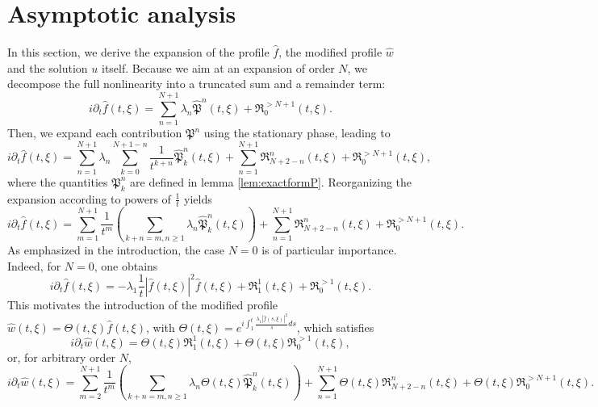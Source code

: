\documentclass[a4paper, 15pt]{article}
\numberwithin{equation}{section}
\begin{document}
\section{Asymptotic analysis}
\label{section:asymptotic}
In this section, we derive the expansion of the profile $\hat{f}$, the modified profile $\hat{w}$ and the solution $u$ itself. Because we aim at an expansion of order $N$, we decompose the full nonlinearity into a truncated sum and a remainder term:
\begin{equation}
    i\partial_t\hat{f}(t,\xi)=\sum_{n=1}^{N+1}\lambda_n\hat{\mathfrak{P}}^n(t,\xi)+\mathfrak{R}^{> N+1}_0(t,\xi).
\end{equation}
Then, we expand each contribution $\mathfrak{P}^n$ using the stationary phase, leading to 
\begin{equation}
    i\partial_t\hat{f}(t,\xi)=\sum_{n=1}^{N+1}\lambda_n\sum_{k=0}^{N+1-n}\frac{1}{t^{k+n}}\hat{\mathfrak{P}}^n_k(t,\xi)+\sum_{n=1}^{N+1}\mathfrak{R}^n_{N+2-n}(t,\xi)+\mathfrak{R}^{> N+1}_0(t,\xi),
\end{equation}
where the quantities $\mathfrak{P}^n_k$ are defined in lemma \ref{lem:exactformP}. Reorganizing the expansion according to powers of $\frac{1}{t}$ yields
\begin{equation}
\label{eq:organizedexp}
    i\partial_t\hat{f}(t,\xi)=\sum_{m=1}^{N+1}\frac{1}{t^m}(\sum_{k+n=m,n\geq1}\lambda_n\hat{\mathfrak{P}}^n_k(t,\xi))+\sum_{n=1}^{N+1}\mathfrak{R}^n_{N+2-n}(t,\xi)+\mathfrak{R}^{> N+1}_0(t,\xi).
\end{equation}
As emphasized in the introduction, the case $N=0$ is of particular importance. Indeed, for $N=0$, one obtains
\begin{equation}
    i\partial_t\hat{f}(t,\xi)=-\lambda_1\frac{1}{t}|\hat{f}(t,\xi)|^2\hat{f}(t,\xi)+\mathfrak{R}^1_{1}(t,\xi)+\mathfrak{R}^{>1}_0(t,\xi).
\end{equation}
This motivates the introduction of the modified profile $\hat{w}(t,\xi)=\Theta(t,\xi)\hat{f}(t,\xi)$, with $\Theta(t,\xi)=e^{i\int^t_1\frac{\lambda_1|\hat{f}(s,\xi)|^2}{s}ds}$, which satisfies 
\begin{equation}
    i\partial_t\hat{w}(t,\xi)=\Theta(t,\xi)\mathfrak{R}^1_{1}(t,\xi)+\Theta(t,\xi)\mathfrak{R}^{>1}_0(t,\xi),
\end{equation}
or, for arbitrary order $N$, 
\begin{equation}
\label{eq:organizedexpw}
    i\partial_t\hat{w}(t,\xi)=\sum_{m=2}^{N+1}\frac{1}{t^m}(\sum_{k+n=m,n\geq1}\lambda_n\Theta(t,\xi)\hat{\mathfrak{P}}^n_k(t,\xi))+\sum_{n=1}^{N+1}\Theta(t,\xi)\mathfrak{R}^n_{N+2-n}(t,\xi)+\Theta(t,\xi)\mathfrak{R}^{> N+1}_0(t,\xi).
\end{equation}
\end{document}
